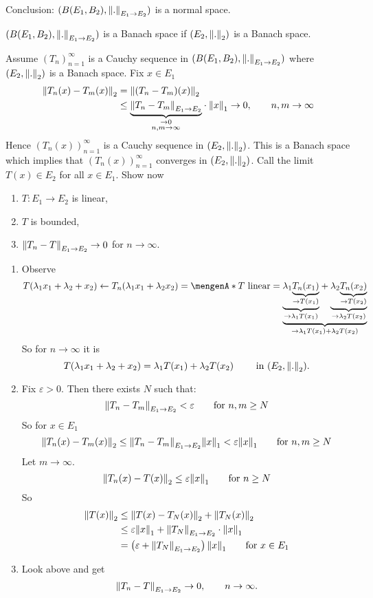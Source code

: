 Conclusion: $(B(E_1,B_2),\norm{.}_{E_1 \to E_2})$ is a normal space. 
\begin{satz*}
	 $(B(E_1,B_2),\norm{.}_{E_1 \to E_2})$ is a Banach space if $(E_2,\norm{.}_2)$ is a Banach space.
\end{satz*}
\begin{beweis}
	Assume $(T_n)_{n=1}^{\infty}$ is a Cauchy sequence in $(B(E_1,B_2),\norm{.}_{E_1 \to E_2})$ where $(E_2, \norm{.}_2)$ is a Banach space. Fix $x \in E_1$
	\begin{align*}
		\norm{T_n(x)-T_m(x)}_2 &= \norm{(T_n-T_m)(x)}_2  \\
		&\leq \underset{\substack{\to 0 \\ n,m \to \infty}}{\underbrace{\norm{T_n-T_m}_{E_1 \to E_2}}} \cdot \norm{x}_1 \to 0, \qquad n,m \to \infty
	\end{align*}
	Hence $(T_n(x))_{n=1}^{\infty}$ is a Cauchy sequence in $(E_2, \norm{.}_2)$. This is a Banach space which implies that $(T_n(x))_{n=1}^{\infty}$ converges in 
	$(E_2,\norm{.}_2)$. Call the limit $T(x) \in E_2$ for all $x \in E_1$. Show now 
	\begin{enumerate}[(1)]
		\item $T: E_1 \to E_2$ is linear,
		\item $T$ is bounded,
		\item $\norm{T_n - T}_{E_1 \to E_2} \to 0$ for $n \to \infty$.
	\end{enumerate}
	\begin{enumerate}[(1)]
		\item Observe 
		\begin{align*}
		T(\lambda_1 x_1 + \lambda_2 + x_2)\leftarrow T_n(\lambda_1 x_1 + \lambda_2 x_2) = \set{T \text{ linear}} = \underset{\to \lambda_1 T(x_1) + \lambda_2 T(x_2)}{\underbrace{\underset{\to \lambda_1 T(x_1)}{\underbrace{\lambda_1 \underset{\to T(x_1)}{\underbrace{T_n(x_1)}}}} + \underset{\to \lambda_2 T(x_2)}{\underbrace{\lambda_2 \underset{\to T(x_2)}{\underbrace{T_n(x_2)}}}}}}
		\end{align*}
		So for $n \to  \infty$ it is
		\[
			T(\lambda_1 x_1 + \lambda_2 + x_2) = \lambda_1 T(x_1) + \lambda_2 T(x_2) \qquad \text{ in }(E_2, \norm{.}_2).
		\]
		\item Fix $\varepsilon >0$. Then there exists $N$ such that:
		\[
			\norm{T_n- T_m}_{E_1 \to E_2} < \varepsilon \qquad \text{for }n,m \geq N
		\]
		So for $x \in E_1$
		\[
			\norm{T_n(x)-T_m(x)}_2 \leq \norm{T_n - T_m}_{E_1 \to E_2} \norm{x}_1 < \varepsilon \norm{x}_1 \qquad \text{for }n,m \geq N
		\]
		Let $m \to \infty$.
		\[
			\norm{T_n(x)- T(x)}_2 \leq \varepsilon \norm{x}_1 \qquad \text{for }n \geq N
 		\]
		So
		\begin{align*}
			\norm{T(x)}_2 &\leq  \norm{T(x)- T_N(x)}_2 + \norm{T_N(x)}_2 \\
			&\leq \varepsilon \norm{x}_1 + \norm{T_N}_{E_1 \to E_2} \cdot \norm{x}_1 \\
			&= \left( \varepsilon +  \norm{T_N}_{E_1 \to E_2} \right) \norm{x}_1 \qquad \text{for }x \in E_1
		\end{align*}
		\item Look above and get
		\[
			\norm{T_n - T}_{E_1 \to E_2} \to 0, \qquad  n \to \infty.
		\]
	\end{enumerate}
\end{beweis}
